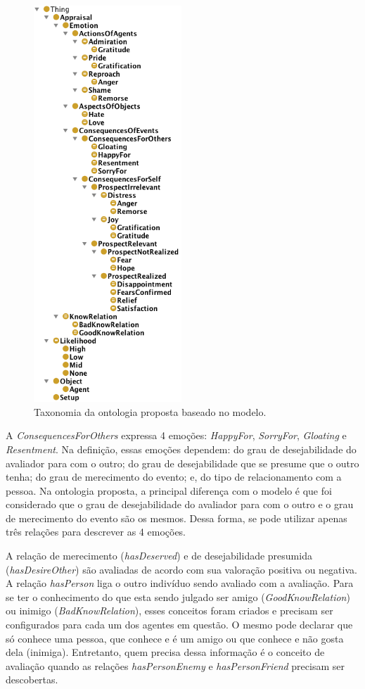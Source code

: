 \begin{figure}
  \includegraphics[height=149mm]{figuras/hierarquiaLOCC.png}
  \caption{Taxonomia da ontologia proposta baseado no modelo.}
  \label{fig:tlocc}
\end{figure}

A \emph{ConsequencesForOthers} expressa 4 emoções: \emph{HappyFor},
\emph{SorryFor}, \emph{Gloating} e \emph{Resentment}. Na definição, essas
emoções dependem: do grau de desejabilidade do avaliador para com o outro; do
grau de desejabilidade que se presume que o outro tenha; do grau de
merecimento do evento; e, do tipo de relacionamento com a pessoa. Na ontologia
proposta, a principal diferença com o modelo \occ é que foi considerado
que o grau de desejabilidade do avaliador para com o outro e o grau de
merecimento do evento são os mesmos. Dessa forma, se pode utilizar apenas três
relações para descrever as 4 emoções.

A relação de merecimento (\emph{hasDeserved}) e de desejabilidade
presumida (\emph{hasDesireOther}) são avaliadas de acordo com sua valoração
positiva ou negativa. A relação \emph{hasPerson} liga o outro indivíduo
sendo avaliado com a avaliação. Para se ter o conhecimento do que esta sendo julgado
ser amigo (\emph{GoodKnowRelation}) ou inimigo (\emph{BadKnowRelation}), esses
conceitos foram criados e precisam ser configurados para cada um dos agentes
em questão. O mesmo pode declarar que só conhece uma pessoa, que conhece e é
um amigo ou que conhece e não gosta dela (inimiga). Entretanto, quem precisa
dessa informação é o conceito de avaliação quando as relações
\emph{hasPersonEnemy} e \emph{hasPersonFriend} precisam ser descobertas.

